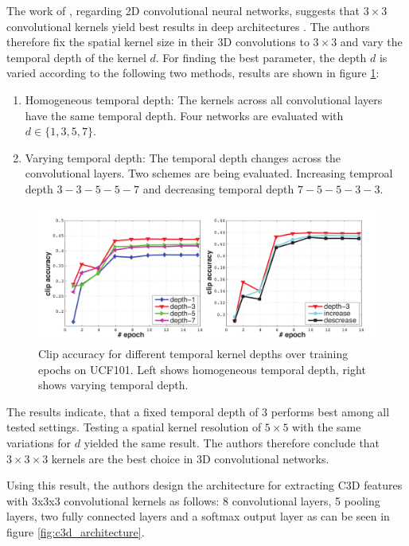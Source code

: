 The work of \textcite{simonyan_very_2014}, regarding 2D convolutional neural networks, suggests that $3\times3$ convolutional kernels yield best results in deep architectures .
The authors therefore fix the spatial kernel size in their 3D convolutions to $3\times3$ and vary the temporal depth of the kernel $d$.
For finding the best parameter, the depth $d$ is varied according to the following two methods, results are shown in figure \ref{fig:c3d_temporaldeptheval}:
\begin{enumerate}
    \item Homogeneous temporal depth: The kernels across all convolutional layers have the same temporal depth. Four networks are evaluated with $d \in \{1, 3, 5, 7\}$.
    \item Varying temporal depth: The temporal depth changes across the convolutional layers. Two schemes are being evaluated. Increasing temproal depth $3-3-5-5-7$ and decreasing temporal depth $7-5-5-3-3$.
\end{enumerate}

\begin{figure}[H]
    \centering
    \includegraphics[width=\textwidth]{img_deep/c3d_temporaldeptheval}
    \caption{Clip accuracy for different temporal kernel depths over training epochs on UCF101. Left shows homogeneous temporal depth, right shows varying temporal depth. \cite{tran_learning_2015}}
    \label{fig:c3d_temporaldeptheval}
\end{figure}

The results indicate, that a fixed temporal depth of 3 performs best among all tested settings.
Testing a spatial kernel resolution of $5\times5$ with the same variations for $d$ yielded the same result.
The authors therefore conclude that $3\times3\times3$ kernels are the best choice in 3D convolutional networks.

Using this result, the authors design the architecture for extracting C3D features with 3x3x3 convolutional kernels as follows: 8 convolutional layers, 5 pooling layers, two fully connected layers and a softmax output layer as can be seen in figure \ref{fig:c3d_architecture}.

